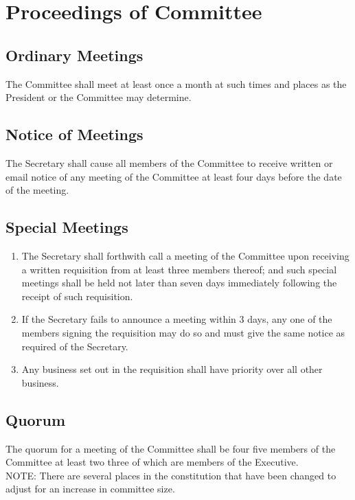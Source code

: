 \documentclass[11pt]{article} %
\begin{document}
\section{Proceedings of Committee}
\subsection{Ordinary Meetings}
The Committee shall meet at least once a month at such times and places as the President or the Committee may determine.
\subsection{Notice of Meetings}
The Secretary shall cause all members of the Committee to receive written or email notice of any meeting of the Committee at least four days before the date of the meeting.
\subsection{Special Meetings}
\begin{enumerate}
	\item The Secretary shall forthwith call a meeting of the Committee upon receiving a written requisition from at least three members thereof; and such special meetings shall be held not later than seven days immediately following the receipt of such requisition.
	\item If the Secretary fails to announce a meeting within 3 days, any one of the members signing the requisition may do so and must give the same notice as required of the Secretary.
	\item Any business set out in the requisition shall have priority over all other business.
\end{enumerate}

\subsection{Quorum}
The quorum for a meeting of the Committee shall be {\color{red}four} {\color{ForestGreen}five} members of the Committee at least {\color{red}two} {\color{ForestGreen}three} of which are members of the Executive.\\
{\color{Cyan}NOTE:
There are several places in the constitution that have been changed to adjust for an increase in committee size.
}
\end{document}
